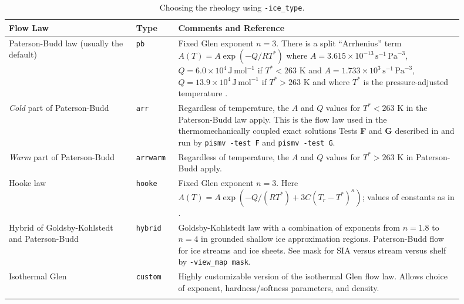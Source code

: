 \documentclass[11pt,final]{amsart}
\renewcommand{\t}[1]{\texttt{#1}}
\newcommand{\ind}[1]{\index{general}{#1}}
\begin{document}
\begin{table}[ht]
\caption{Choosing the rheology using \t{-ice_type}.}\label{tab:flowlaw}\ind{rheology}\ind{flow law}
\small
\begin{tabular}{p{0.25\linewidth}p{0.08\linewidth}p{0.57\linewidth}}\hline
\textbf{Flow Law} & \textbf{Type} & \textbf{Comments and Reference} \\ \hline
Paterson-Budd law (usually the default)  &  \t{pb} &   Fixed Glen exponent $n=3$.  There is a split ``Arrhenius'' term $A(T) = A \exp(-Q/RT^*)$ where \mbox{$A = 3.615 \times 10^{-13}\, \text{s}^{-1}\, \text{Pa}^{-3}$}, \mbox{$Q = 6.0 \times 10^4\, \text{J}\, \text{mol}^{-1}$} if $T^* < 263$ K and
 \mbox{$A = 1.733 \times 10^{3}\, \text{s}^{-1}\, \text{Pa}^{-3}$}, \mbox{$Q = 13.9 \times 10^4\, \text{J}\, \text{mol}^{-1}$} if $T^* > 263$ K and where $T^*$ is the pressure-adjusted temperature \cite{PatersonBudd}. \\
\emph{Cold} part of Paterson-Budd &  \t{arr} &   Regardless of temperature, the $A$ and $Q$ values for $T^*<263$ K in  the Paterson-Budd law apply.  This is the flow law used in the thermomechanically coupled exact solutions Tests \textbf{F} and \textbf{G} described in \cite{BBL,BB} and run by \texttt{pismv -test F} and \texttt{pismv -test G}. \\

\emph{Warm} part of Paterson-Budd     &  \t{arrwarm} & Regardless of temperature, the $A$ and $Q$ values for $T^*>263$ K in Paterson-Budd apply.\\
Hooke law   &  \t{hooke} &  Fixed Glen exponent $n=3$.  Here  $A(T) = A \exp(-Q/(RT^*) + 3C (T_r - T^*)^\kappa)$; values of  constants as in \cite{Hooke,PayneBaldwin}.\\
Hybrid of Goldsby-Kohlstedt and Paterson-Budd & \t{hybrid} &     Goldsby-Kohlstedt law with a combination of exponents  from $n=1.8$ to $n=4$ \cite{GoldsbyKohlstedt} in grounded  shallow ice approximation regions.  Paterson-Budd flow  for ice streams and ice sheets. See mask for SIA versus stream versus shelf by \texttt{-view_map mask}. \\
Isothermal Glen & \t{custom} & Highly customizable version of the isothermal Glen flow law.  Allows choice of exponent, hardness/softness parameters, and density. \\
\hline
\normalsize	
\end{tabular}
\end{table}
\end{document}
